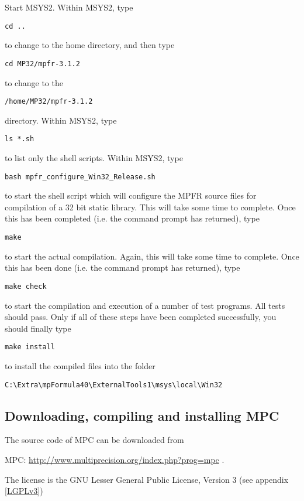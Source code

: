 \vpara
Start MSYS2. Within MSYS2, type
\begin{verbatim}
cd ..
\end{verbatim}
to change to the home directory, and then type 
\begin{verbatim}
cd MP32/mpfr-3.1.2
\end{verbatim}
to change to the
\begin{verbatim}
/home/MP32/mpfr-3.1.2
\end{verbatim}
directory. Within MSYS2, type
\begin{verbatim}
ls *.sh
\end{verbatim}
to list only the shell scripts. Within MSYS2, type
\begin{verbatim}
bash mpfr_configure_Win32_Release.sh
\end{verbatim}
to start the shell script which will configure the MPFR source files for compilation of a 32 bit static library. This will take some time to complete. Once this has been completed (i.e. the command prompt has returned), type
\begin{verbatim}
make
\end{verbatim}
to start the actual compilation. Again, this will take some time to complete. Once this has been done (i.e. the command prompt has returned), type
\begin{verbatim}
make check
\end{verbatim}
to start the compilation and execution of a number of test programs. All tests should pass. Only if all of these steps have been completed successfully, you should finally type
\begin{verbatim}
make install
\end{verbatim}
to install the compiled files into the folder
\begin{verbatim}
C:\Extra\mpFormula40\ExternalTools1\msys\local\Win32
\end{verbatim}




\newpage
\subsection{Downloading, compiling and installing MPC}
The source code of MPC can be downloaded from

MPC: \href{http://www.multiprecision.org/index.php?prog=mpc}{http://www.multiprecision.org/index.php?prog=mpc} .

The license is the GNU Lesser General Public License, Version 3 (see appendix \ref{LGPLv3})

